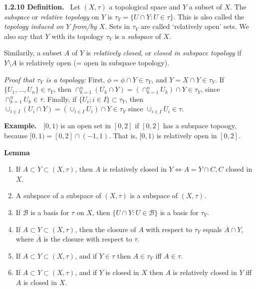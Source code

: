 \documentclass[12pt]{article}
\newcommand{\lrimply}[0] { \Leftrightarrow }
\newcommand{\B}[0] { \mathcal{B} }
\begin{document}
\begin{flushleft}
 { \bf 1.2.10 Definition. } \ Let $(X, \tau)$ a topological space and $Y$ a
subset of $X$.  The \emph{subspace} or \emph{relative topology} on $Y$ is
$\tau_Y = \{ U \cap Y: U \in \tau \}$. This is also
called the \emph{topology induced on $Y$ from/by $X$}. Sets in $\tau_Y$ are
called `relatively open' sets. We also say that $Y$ with its topology $\tau_Y$ is a \emph{subspace} of $X$.

Similarily, a subset $A$ of $Y$ is \emph{relatively closed}, or \emph{closed in subspace topology} if $Y \setminus A$ is relatively open (= open in subspace topology).\begin{flushleft}
 \emph{Proof that $\tau_Y$ is a topology:}  First,
 $\phi = \phi \cap Y \in \tau_Y$, and $Y = X \cap Y \in \tau_Y$.
If  $\{ U_1, ..., U_n \} \in \tau_Y$, then $\cap_{k=1}^n (U_k \cap Y) = \left( \cap_{k=1}^n U_k \right) \cap Y \in \tau_Y$, since $\cap_{k=1}^n U_k \in \tau$. Finally, if $\{ U_i; i \in I \} \subset \tau_Y$, then $\cup_{i \in I} ( U_i \cap Y) = \left( \cup_{i \in I} U_i \right) \cap Y \in \tau_Y$ since $\cup_{i \in I} U_i \in \tau$.\end{flushleft}\end{flushleft}\begin{flushleft}
 { \bf Example. \ }$[0,1)$ is an open set in $[0,2]$ if $[0,2]$ has a subspace topoogy,
because $[0,1) = [0,2] \cap (-1,1)$.
That is, $[0,1)$
 is relatively open in $[0,2]$.\end{flushleft}\begin{flushleft}


 { \bf Lemma }\begin{enumerate}
\item If $A \subset Y \subset (X, \tau)$, then $A$ is relatively closed in $Y \lrimply A = Y \cap C, C$ closed in $X$.
\item A subspace of a subspace of $(X, \tau)$ is a subspace of $(X, \tau)$.
\item If $\B$ is a basis for $\tau$ on $X$, then $\{ U \cap Y :
 U \in \B \}$ is a basis for $\tau_Y$.
\item If $A \subset Y \subset (X, \tau)$, then the closure of $A$ with respect to $\tau_Y$ equals $\overline{A} \cap Y$, where $\overline{A}$ is the closure with respect to $\tau$.
\item  If $A \subset Y \subset (X, \tau)$, and if $Y \in \tau$ then
$A \in \tau_Y$ iff $A \in \tau$.
\item If $A \subset Y \subset (X, \tau)$, and if $Y$ is closed in $X$
then $A$ is relatively closed in $Y$ iff $A$ is closed in $X$.
\end{enumerate}\end{flushleft}
\end{document}
